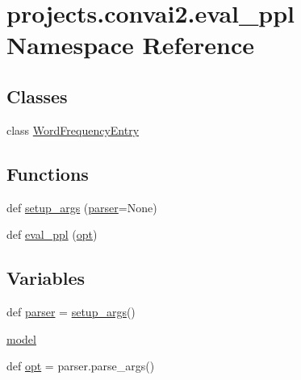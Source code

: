 \hypertarget{namespaceprojects_1_1convai2_1_1eval__ppl}{}\section{projects.\+convai2.\+eval\+\_\+ppl Namespace Reference}
\label{namespaceprojects_1_1convai2_1_1eval__ppl}
\subsection*{Classes}
\begin{DoxyCompactItemize}
\item 
class \hyperlink{classprojects_1_1convai2_1_1eval__ppl_1_1WordFrequencyEntry}{Word\+Frequency\+Entry}
\end{DoxyCompactItemize}
\subsection*{Functions}
\begin{DoxyCompactItemize}
\item 
def \hyperlink{namespaceprojects_1_1convai2_1_1eval__ppl_ac83f1cd52a81f455fc2e726d76e1100e}{setup\+\_\+args} (\hyperlink{namespaceprojects_1_1convai2_1_1eval__ppl_aa3499dcfaca797b06a129770408bd8f6}{parser}=None)
\item 
def \hyperlink{namespaceprojects_1_1convai2_1_1eval__ppl_a417da48148c825ed1f5d6897cef06819}{eval\+\_\+ppl} (\hyperlink{namespaceprojects_1_1convai2_1_1eval__ppl_abb42c6a8781f962f99b16a768d285183}{opt})
\end{DoxyCompactItemize}
\subsection*{Variables}
\begin{DoxyCompactItemize}
\item 
def \hyperlink{namespaceprojects_1_1convai2_1_1eval__ppl_aa3499dcfaca797b06a129770408bd8f6}{parser} = \hyperlink{namespaceprojects_1_1convai2_1_1eval__ppl_ac83f1cd52a81f455fc2e726d76e1100e}{setup\+\_\+args}()
\item 
\hyperlink{namespaceprojects_1_1convai2_1_1eval__ppl_a81688f1ad5f54db5f1ffa1388412cc97}{model}
\item 
def \hyperlink{namespaceprojects_1_1convai2_1_1eval__ppl_abb42c6a8781f962f99b16a768d285183}{opt} = parser.\+parse\+\_\+args()
\end{DoxyCompactItemize}


